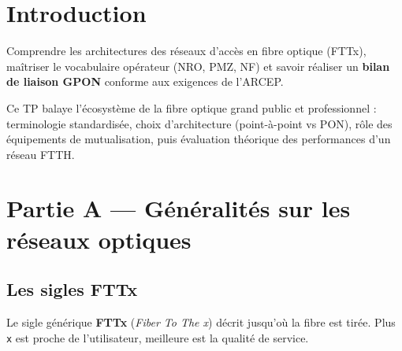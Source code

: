 \documentclass[11pt,a4paper]{article}
\begin{document}
\setcounter{page}{1}

{\sffamily
\hypersetup{linkcolor=primary}
\renewcommand{\contentsname}{\textcolor{accent}{\faList~} Sommaire}
\tableofcontents
}
\vspace{0.4cm}

\section{Introduction}

\begin{infobox}[title={\faBullseye~Objectif}]
Comprendre les architectures des réseaux d'accès en fibre optique (FTTx), maîtriser le vocabulaire opérateur (NRO, PMZ, NF) et savoir réaliser un \textbf{bilan de liaison GPON} conforme aux exigences de l'ARCEP.
\end{infobox}

Ce TP balaye l'écosystème de la fibre optique grand public et professionnel : terminologie standardisée, choix d'architecture (point-à-point vs PON), rôle des équipements de mutualisation, puis évaluation théorique des performances d'un réseau FTTH.

\section{Partie A — Généralités sur les réseaux optiques}

\subsection{Les sigles FTTx}

Le sigle générique \textbf{FTTx} (\emph{Fiber To The x}) décrit jusqu'où la fibre est tirée. Plus \texttt{x} est proche de l'utilisateur, meilleure est la qualité de service.
\end{document}
